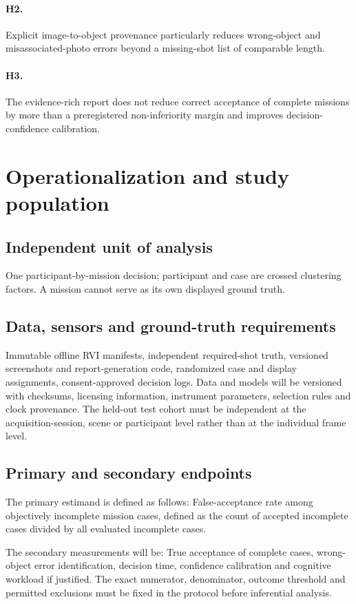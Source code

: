 \documentclass[11pt,a4paper]{article}
\begin{document}
\paragraph{H2.} Explicit image-to-object provenance particularly reduces wrong-object and misassociated-photo errors beyond a missing-shot list of comparable length.

\paragraph{H3.} The evidence-rich report does not reduce correct acceptance of complete missions by more than a preregistered non-inferiority margin and improves decision-confidence calibration.

\section{Operationalization and study population}
\subsection{Independent unit of analysis}
One participant-by-mission decision; participant and case are crossed clustering factors. A mission cannot serve as its own displayed ground truth.

\subsection{Data, sensors and ground-truth requirements}
Immutable offline RVI manifests, independent required-shot truth, versioned screenshots and report-generation code, randomized case and display assignments, consent-approved decision logs. Data and models will be versioned with checksums, licensing information, instrument parameters, selection rules and clock provenance. The held-out test cohort must be independent at the acquisition-session, scene or participant level rather than at the individual frame level.

\subsection{Primary and secondary endpoints}
The primary estimand is defined as follows: False-acceptance rate among objectively incomplete mission cases, defined as the count of accepted incomplete cases divided by all evaluated incomplete cases.

The secondary measurements will be: True acceptance of complete cases, wrong-object error identification, decision time, confidence calibration and cognitive workload if justified. The exact numerator, denominator, outcome threshold and permitted exclusions must be fixed in the protocol before inferential analysis.
\end{document}
